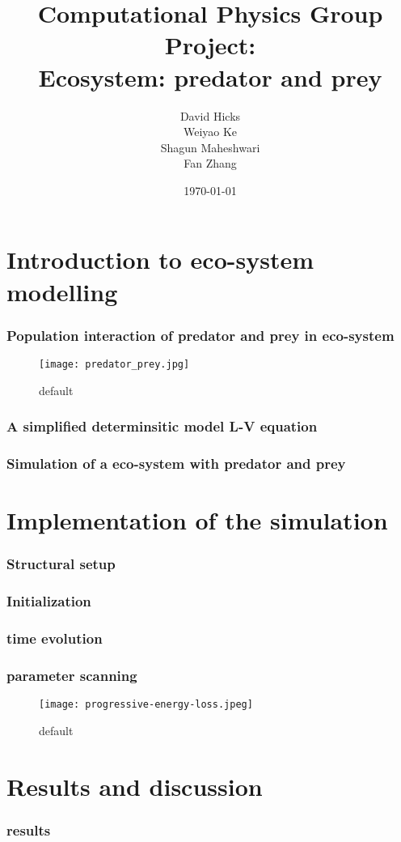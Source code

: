 \documentclass{beamer}
\title{Computational Physics Group Project: \\ Ecosystem: predator and prey}
\author{David Hicks\\ Weiyao Ke \\ Shagun Maheshwari \\ Fan Zhang}
\date{\today}
\begin{document}
\frame{\titlepage}

\section[Outline]{}
\frame{\tableofcontents}

\section{Introduction to eco-system modelling}
\frame
{
  \frametitle{Population interaction of predator and prey in eco-system}
\begin{figure}[htbp]
\begin{center}
\texttt{[image: predator\_prey.jpg]}
\caption{default}
\label{default}
\end{center}
\end{figure}

  
}
\frame
{
  \frametitle{A simplified determinsitic model L-V equation}
  
}
\frame
{
  \frametitle{Simulation of a eco-system with predator and prey}
  
}

\section{Implementation of the simulation}
\frame
{
  \frametitle{Structural setup}
  
}

\frame
{
  \frametitle{Initialization}
  
}

\frame
{
  \frametitle{time evolution}
  
}

\frame
{
  \frametitle{parameter scanning}
\begin{figure}[htbp]
\begin{center}
\texttt{[image: progressive-energy-loss.jpeg]}
\caption{default}
\label{default}
\end{center}
\end{figure}

  
}

\section{Results and discussion}
\frame
{
  \frametitle{results}
  
}
\end{document}
